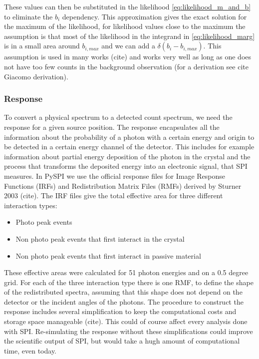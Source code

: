 \documentclass[twocolumn]{aa}
\begin{document}
These values can then be substituted in the likelihood \ref{eq:likelihood_m_and_b} to eliminate the $b_{i}$ dependency. This approximation gives the exact solution for the maximum of the likelihood, for likelihood values close to the maximum the assumption is that most of the likelihood in the integrand in \ref{eq:likelihood_marg} is in a small area around $b_{i,max}$ and we can add a $\delta(b_{i}-b_{{i,max}})$. This assumption is used in many works (cite) and works very well as long as one does not have too few counts in the background observation (for a derivation see cite Giacomo derivation).

\subsubsection*{Response}

To convert a physical spectrum to a detected count spectrum, we need the response for a given source position. The response encapsulates all the information about the probability of a photon with a certain energy and origin to be detected in a certain energy channel of the detector. This includes for example information about partial energy deposition of the photon in the crystal and the process that transforms the deposited energy into an electronic signal, that SPI measures.
In PySPI we use the official response files for Image Response Functions (IRFs) and Redistribution Matrix Files (RMFs) derived by Sturner 2003 (cite). The IRF files give the total effective area for three different interaction types:
\begin{itemize}
  \item Photo peak events
  \item Non photo peak events that first interact in the crystal
  \item Non photo peak events that first interact in passive material
\end{itemize}

These effective areas were calculated for 51 photon energies and on a 0.5 degree grid. For each of the three interaction type there is one RMF, to define the shape of the redistributed spectra, assuming that this shape does not depend on the detector or the incident angles of the photons.
The procedure to construct the response includes several simplification to keep the computational costs and storage space manageable (cite). This could of course affect every analysis done with SPI. Re-simulating the response without these simplifications could improve the scientific output of SPI, but would take a hugh amount of computational time, even today.
\end{document}
